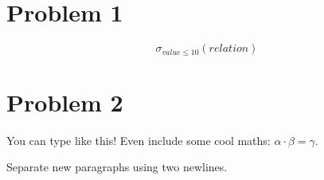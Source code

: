 \documentclass{article}
\begin{document}
\section*{Problem 1}

\begin{equation*}
    \sigma_{value \leq 10}(relation)
\end{equation*}

\newpage
\section*{Problem 2}
You can type like this! Even include some cool maths: $\alpha \cdot \beta = \gamma$.

Separate new paragraphs using two newlines.

\end{document}
